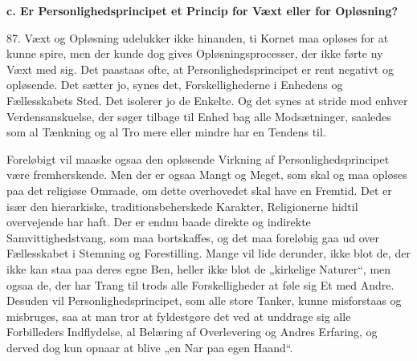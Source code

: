 \documentclass[12pt,a4paper,openany]{book}
\begin{document}
\begin{center}\textbf{c. Er Personlighedsprincipet et Princip for Væxt eller for Opløsning?}\end{center}

87. Væxt og Opløsning udelukker ikke hinanden, ti Kornet maa opløses for
at kunne spire, men der kunde dog gives Opløsningsprocesser, der ikke
førte ny Væxt med sig. Det paastaas ofte, at Personlighedsprincipet er
rent negativt og opløsende. Det sætter jo, synes det, Forskellighederne
i Enhedens og Fællesskabets Sted. Det isolerer jo de Enkelte. Og det
synes at stride mod enhver Verdensanskuelse, der søger tilbage til Enhed
bag alle Modsætninger, saaledes som al Tænkning og al Tro mere eller
mindre har en Tendens til.

Foreløbigt vil maaske ogsaa den opløsende Virkning af
Personlighedsprincipet være fremherskende. Men der er ogsaa Mangt og
Meget, som skal og maa opløses paa det religiøse Omraade, om dette
overhovedet skal have en Fremtid. Det er især den hierarkiske,
traditionsbeherskede Karakter, Religionerne hidtil overvejende har haft.
Der er endnu baade direkte og indirekte Samvittighedstvang, som maa
bortskaffes, og det maa foreløbig gaa ud over Fællesskabet i Stemning og
Forestilling. Mange vil lide derunder, ikke blot de, der ikke kan staa
paa deres egne Ben, heller ikke blot de „kirkelige Naturer“, men ogsaa
de, der har Trang til trods alle Forskelligheder at føle sig Et med
Andre. Desuden vil Personlighedsprincipet, som alle store Tanker, kunne
misforstaas og misbruges, saa at man tror at fyldestgøre det ved at
unddrage sig alle Forbilleders Indflydelse, al Belæring af Overlevering
og Andres Erfaring, og derved dog kun opnaar at blive „en Nar paa egen
Haand“.
\end{document}
